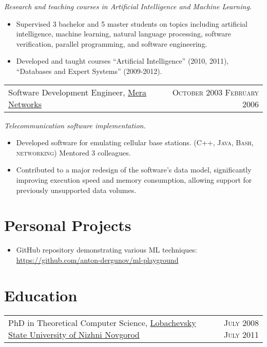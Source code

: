 \documentclass{article}
\makeatletter
\newcommand{\whatwherewhen}[3]{
\noindent\begin{tabular*}{\columnwidth}{@{}@{\extracolsep{\fill}}lr@{}}
#1, #2 & \textsc{#3}
\end{tabular*}}
\newcommand{\smallvskip}{\vskip2mm}
\makeatother
\begin{document}
\textit{Research and teaching courses in Artificial Intelligence and Machine Learning.}

\begin{itemize}

\item Supervised 3 bachelor and 5 master students on topics including artificial intelligence, machine learning, natural language processing, software verification, parallel programming, and software engineering.

\item Developed and taught courses ``Artificial Intelligence'' (2010, 2011), ``Databases and Expert Systems'' (2009-2012).

\end{itemize}


\smallvskip
\whatwherewhen{Software Development Engineer}{\href{http://mera.ru/}{Mera Networks}}{October 2003 \textendash{} February 2006}

\textit{Telecommunication software implementation.}

\begin{itemize}

\item Developed software for emulating cellular base stations. (\textsc{C++}, \textsc{Java}, \textsc{Bash}, \textsc{networking}) Mentored 3 colleagues.
\item Contributed to a major redesign of the software's data model, significantly improving execution speed and memory consumption, allowing support for previously unsupported data volumes.

\end{itemize}


\section{Personal Projects}

\begin{itemize}
\item GitHub repository demonstrating various ML techniques: \href{https://github.com/anton-dergunov/ml-playground}{https://github.com/anton-dergunov/ml-playground}
\end{itemize}


\section{Education}

\whatwherewhen{PhD in Theoretical Computer Science}{\href{http://unn.ru}{Lobachevsky State University of Nizhni Novgorod}}{July 2008 \textendash{} July 2011}
\end{document}

